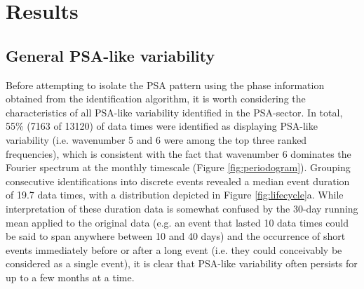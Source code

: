 \section{Results}

\subsection{General PSA-like variability}

Before attempting to isolate the PSA pattern using the phase information obtained from the identification algorithm, it is worth considering the characteristics of all PSA-like variability identified in the PSA-sector. In total, 55\% (7163 of 13120) of data times were identified as displaying PSA-like variability (i.e. wavenumber 5 and 6 were among the top three ranked frequencies), which is consistent with the fact that wavenumber 6 dominates the Fourier spectrum at the monthly timescale (Figure \ref{fig:periodogram}). Grouping consecutive identifications into discrete events revealed a median event duration of 19.7 data times, with a distribution depicted in Figure \ref{fig:lifecycle}a. While interpretation of these duration data is somewhat confused by the 30-day running mean applied to the original data (e.g. an event that lasted 10 data times could be said to span anywhere between 10 and 40 days) and the occurrence of short events immediately before or after a long event (i.e. they could conceivably be considered as a single event), it is clear that PSA-like variability often persists for up to a few months at a time.     


